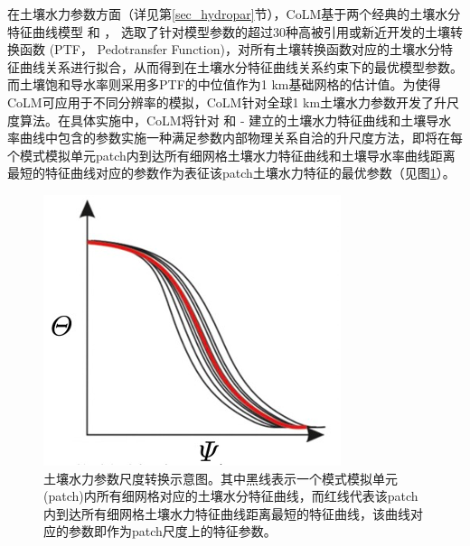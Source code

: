 在土壤水力参数方面（详见第\ref{sec_hydropar}节），CoLM基于两个经典的土壤水分特征曲线模型 \citet{campbell1974} 和 \citet{van1980closed}，
选取了针对模型参数的超过30种高被引用或新近开发的土壤转换函数 (PTF， Pedotransfer Function)，对所有土壤转换函数对应的土壤水分特征曲线关系进行拟合，从而得到在土壤水分特征曲线关系约束下的最优模型参数。而土壤饱和导水率则采用多PTF的中位值作为1 km基础网格的估计值。为使得CoLM可应用于不同分辨率的模拟，CoLM针对全球1 km土壤水力参数开发了升尺度算法。在具体实施中，CoLM将针对 \citet{campbell1974} 和 \citet{van1980closed}-\citet{mualem1976new} 建立的土壤水力特征曲线和土壤导水率曲线中包含的参数实施一种满足参数内部物理关系自洽的升尺度方法，即将在每个模式模拟单元patch内到达所有细网格土壤水力特征曲线和土壤导水率曲线距离最短的特征曲线对应的参数作为表征该patch土壤水力特征的最优参数（见图\ref{fig:土壤水力参数尺度转换示意图}）。
{
\begin{figure}[htbp]
\centering
\includegraphics{Figures/尺度转换/土壤水力参数尺度转换示意图.png}
\caption{土壤水力参数尺度转换示意图。其中黑线表示一个模式模拟单元(patch)内所有细网格对应的土壤水分特征曲线，而红线代表该patch内到达所有细网格土壤水力特征曲线距离最短的特征曲线，该曲线对应的参数即作为patch尺度上的特征参数。}
\label{fig:土壤水力参数尺度转换示意图}
\end{figure}
}

